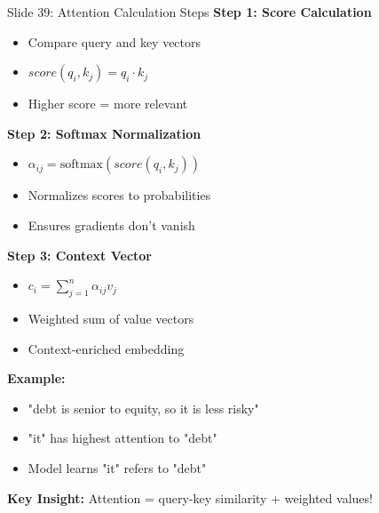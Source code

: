 \documentclass[8pt]{beamer}
\begin{document}
	\begin{frame}{Slide 39: Attention Calculation Steps}
		\fontsize{6.5}{7.5}\selectfont
		\textbf{Step 1: Score Calculation}
		\begin{itemize}
			\item Compare query and key vectors
			\item $score(q_i, k_j) = q_i \cdot k_j$
			\item Higher score = more relevant
		\end{itemize}
		
		\vspace{0.1cm}
		\textbf{Step 2: Softmax Normalization}
		\begin{itemize}
			\item $\alpha_{ij} = \text{softmax}(score(q_i, k_j))$
			\item Normalizes scores to probabilities
			\item Ensures gradients don't vanish
		\end{itemize}
		
		\vspace{0.1cm}
		\textbf{Step 3: Context Vector}
		\begin{itemize}
			\item $c_i = \sum_{j=1}^n \alpha_{ij} v_j$
			\item Weighted sum of value vectors
			\item Context-enriched embedding
		\end{itemize}
		
		\vspace{0.1cm}
		\textbf{Example:}
		\begin{itemize}
			\item "debt is senior to equity, so it is less risky"
			\item "it" has highest attention to "debt"
			\item Model learns "it" refers to "debt"
		\end{itemize}
		
		\textcolor{myblue}{\textbf{Key Insight:}} Attention = query-key similarity + weighted values!
	\end{frame}
	
\end{document}
